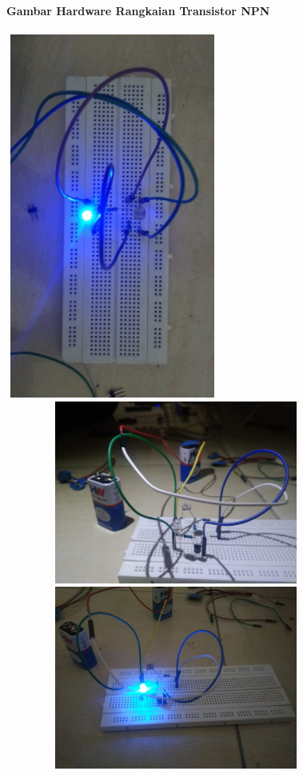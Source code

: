\documentclass[12pt,a4paper]{article}
\begin{document}
\newpage
\begin{figure}
\paragraph{Gambar Hardware Rangkaian Transistor NPN}
\paragraph{ }
\begin{center}

\includegraphics[width=7cm, height=12cm]{g4.png}

\includegraphics[width=12cm, height=6cm]{g5.png}

\includegraphics[width=12cm, height=6cm]{g6.png}
\end{center}
\end{figure}
\vspace{2cm}
\end{document}
